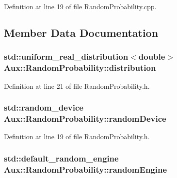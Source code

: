 Definition at line 19 of file Random\-Probability.\-cpp.



\subsection{Member Data Documentation}
\hypertarget{class_aux_1_1_random_probability_aea37d3428c64a4d88cfec092f1fa5d85}{
\subsubsection[{distribution}]{\setlength{\rightskip}{0pt plus 5cm}std\-::uniform\-\_\-real\-\_\-distribution$<$double$>$ Aux\-::\-Random\-Probability\-::distribution\hspace{0.3cm}{\ttfamily [protected]}}}\label{class_aux_1_1_random_probability_aea37d3428c64a4d88cfec092f1fa5d85}


Definition at line 21 of file Random\-Probability.\-h.

\hypertarget{class_aux_1_1_random_probability_ae714dbdb46cb0ab965d2e2f544f9ad4a}{
\subsubsection[{random\-Device}]{\setlength{\rightskip}{0pt plus 5cm}std\-::random\-\_\-device Aux\-::\-Random\-Probability\-::random\-Device\hspace{0.3cm}{\ttfamily [protected]}}}\label{class_aux_1_1_random_probability_ae714dbdb46cb0ab965d2e2f544f9ad4a}


Definition at line 19 of file Random\-Probability.\-h.

\hypertarget{class_aux_1_1_random_probability_af8f4edb5271507e52daad5b0ceff1680}{
\subsubsection[{random\-Engine}]{\setlength{\rightskip}{0pt plus 5cm}std\-::default\-\_\-random\-\_\-engine Aux\-::\-Random\-Probability\-::random\-Engine\hspace{0.3cm}{\ttfamily [protected]}}}\label{class_aux_1_1_random_probability_af8f4edb5271507e52daad5b0ceff1680}


